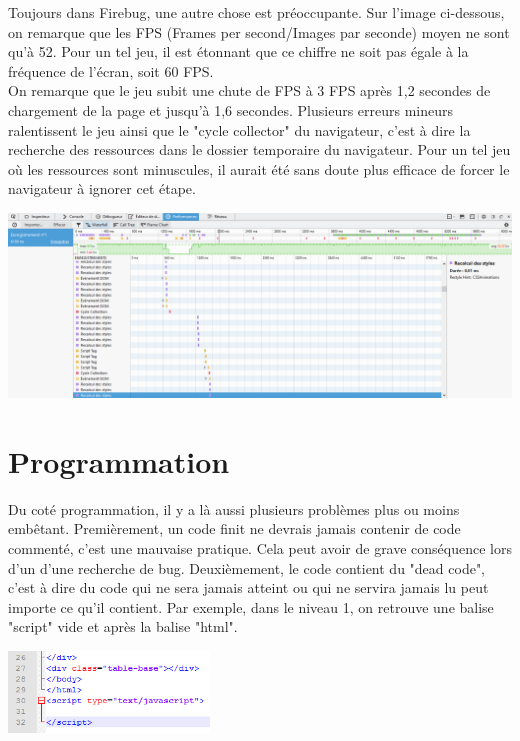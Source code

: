 \documentclass{article}
\begin{document}
Toujours dans Firebug, une autre chose est préoccupante. Sur l'image ci-dessous, on remarque que les FPS (Frames per second/Images par seconde) moyen ne sont qu'à 52. Pour un tel jeu, il est étonnant que ce chiffre ne soit pas égale à la fréquence de l'écran, soit 60 FPS. \\

On remarque que le jeu subit une chute de FPS à 3 FPS après 1,2 secondes de chargement de la page et jusqu'à 1,6 secondes. Plusieurs erreurs mineurs ralentissent le jeu ainsi que le "cycle collector" du navigateur, c'est à dire la recherche des ressources dans le dossier temporaire du navigateur. Pour un tel jeu où les ressources sont minuscules, il aurait été sans doute plus efficace de forcer le navigateur à ignorer cet étape.
\begin{center}
\vspace{0.5cm}
\includegraphics[width=\textwidth]{8}\\
\end{center}

\newpage

\section{Programmation}

\hspace*{0.6cm}Du coté programmation, il y a là aussi plusieurs problèmes plus ou moins embêtant. Premièrement, un code finit ne devrais jamais contenir de code commenté, c'est une mauvaise pratique. Cela peut avoir de grave conséquence lors d'un d'une recherche de bug. Deuxièmement, le code contient du "dead code", c'est à dire du code qui ne sera jamais atteint ou qui ne servira jamais lu peut importe ce qu'il contient. Par exemple, dans le niveau 1, on retrouve une balise "script" vide et après la balise "html".

\vspace{0.4cm}
\includegraphics[width=0.40\textwidth]{9}\\
\end{document}
